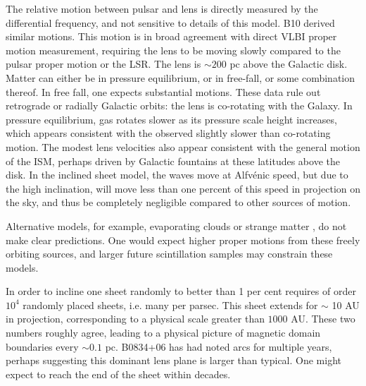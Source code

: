 \documentclass[useAMS,usenatbib]{mn2e}
\begin{document}
The relative motion between pulsar and lens is directly measured by
the differential frequency, and not sensitive to details of this
model. B10 derived similar motions.  This
motion is in broad agreement with direct VLBI proper motion
measurement, requiring the lens to be moving slowly compared to the
pulsar proper motion or the LSR.  The lens is $\sim200$ pc above the
Galactic disk.  Matter can either be in pressure equilibrium, or in
free-fall, or some combination thereof.  In free fall, one expects
substantial motions.  These data rule out retrograde or radially
Galactic orbits: the lens is co-rotating with the Galaxy.  In pressure
equilibrium, gas rotates slower as its pressure scale height
increases, which appears consistent with the observed slightly slower
than co-rotating motion.  The modest lens velocities also appear
consistent with the general motion of the ISM, perhaps driven by
Galactic fountains \citep{1976ApJ...205..762S} at these latitudes above
the disk.  In the inclined sheet model, the waves move at Alfv\'enic
speed, but due to the high inclination, will move less than one percent of this
speed in projection on the sky, and thus be completely negligible compared to
other sources of motion.

Alternative models, for example, evaporating
clouds \citep{1998ApJ...498L.125W} or strange
matter \citep{2013PhLB..727..357P}, do not make clear predictions.  One
would expect higher proper motions from these freely orbiting sources,
and larger future scintillation samples may constrain these models.

In order to incline one sheet randomly to better than 1 per cent requires of
order $10^4$ randomly placed sheets, i.e. many per parsec.  This sheet
extends for $\sim$ 10 AU in projection, corresponding to a physical
scale greater than $1000$ AU.   These two numbers roughly agree,
leading to a physical picture of magnetic domain boundaries every
$\sim 0.1$ pc.  B0834+06 has had noted arcs for multiple years,
perhaps suggesting this dominant lens plane is larger than typical.
One might expect to reach the end of the sheet within decades.
\end{document}
